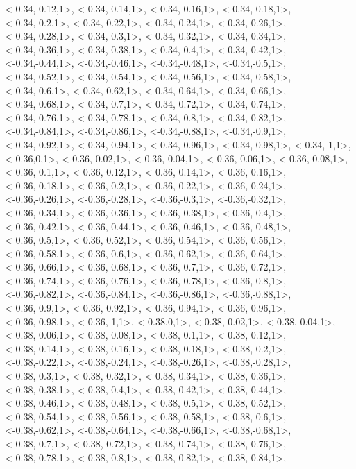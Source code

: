 \documentclass[a4paper,10pt]{article}
\begin{document}
\begin{eulernotebook}
\begin{euleroutput}
  <-0.34,-0.12,1>,
  <-0.34,-0.14,1>,
  <-0.34,-0.16,1>,
  <-0.34,-0.18,1>,
  <-0.34,-0.2,1>,
  <-0.34,-0.22,1>,
  <-0.34,-0.24,1>,
  <-0.34,-0.26,1>,
  <-0.34,-0.28,1>,
  <-0.34,-0.3,1>,
  <-0.34,-0.32,1>,
  <-0.34,-0.34,1>,
  <-0.34,-0.36,1>,
  <-0.34,-0.38,1>,
  <-0.34,-0.4,1>,
  <-0.34,-0.42,1>,
  <-0.34,-0.44,1>,
  <-0.34,-0.46,1>,
  <-0.34,-0.48,1>,
  <-0.34,-0.5,1>,
  <-0.34,-0.52,1>,
  <-0.34,-0.54,1>,
  <-0.34,-0.56,1>,
  <-0.34,-0.58,1>,
  <-0.34,-0.6,1>,
  <-0.34,-0.62,1>,
  <-0.34,-0.64,1>,
  <-0.34,-0.66,1>,
  <-0.34,-0.68,1>,
  <-0.34,-0.7,1>,
  <-0.34,-0.72,1>,
  <-0.34,-0.74,1>,
  <-0.34,-0.76,1>,
  <-0.34,-0.78,1>,
  <-0.34,-0.8,1>,
  <-0.34,-0.82,1>,
  <-0.34,-0.84,1>,
  <-0.34,-0.86,1>,
  <-0.34,-0.88,1>,
  <-0.34,-0.9,1>,
  <-0.34,-0.92,1>,
  <-0.34,-0.94,1>,
  <-0.34,-0.96,1>,
  <-0.34,-0.98,1>,
  <-0.34,-1,1>,
  <-0.36,0,1>,
  <-0.36,-0.02,1>,
  <-0.36,-0.04,1>,
  <-0.36,-0.06,1>,
  <-0.36,-0.08,1>,
  <-0.36,-0.1,1>,
  <-0.36,-0.12,1>,
  <-0.36,-0.14,1>,
  <-0.36,-0.16,1>,
  <-0.36,-0.18,1>,
  <-0.36,-0.2,1>,
  <-0.36,-0.22,1>,
  <-0.36,-0.24,1>,
  <-0.36,-0.26,1>,
  <-0.36,-0.28,1>,
  <-0.36,-0.3,1>,
  <-0.36,-0.32,1>,
  <-0.36,-0.34,1>,
  <-0.36,-0.36,1>,
  <-0.36,-0.38,1>,
  <-0.36,-0.4,1>,
  <-0.36,-0.42,1>,
  <-0.36,-0.44,1>,
  <-0.36,-0.46,1>,
  <-0.36,-0.48,1>,
  <-0.36,-0.5,1>,
  <-0.36,-0.52,1>,
  <-0.36,-0.54,1>,
  <-0.36,-0.56,1>,
  <-0.36,-0.58,1>,
  <-0.36,-0.6,1>,
  <-0.36,-0.62,1>,
  <-0.36,-0.64,1>,
  <-0.36,-0.66,1>,
  <-0.36,-0.68,1>,
  <-0.36,-0.7,1>,
  <-0.36,-0.72,1>,
  <-0.36,-0.74,1>,
  <-0.36,-0.76,1>,
  <-0.36,-0.78,1>,
  <-0.36,-0.8,1>,
  <-0.36,-0.82,1>,
  <-0.36,-0.84,1>,
  <-0.36,-0.86,1>,
  <-0.36,-0.88,1>,
  <-0.36,-0.9,1>,
  <-0.36,-0.92,1>,
  <-0.36,-0.94,1>,
  <-0.36,-0.96,1>,
  <-0.36,-0.98,1>,
  <-0.36,-1,1>,
  <-0.38,0,1>,
  <-0.38,-0.02,1>,
  <-0.38,-0.04,1>,
  <-0.38,-0.06,1>,
  <-0.38,-0.08,1>,
  <-0.38,-0.1,1>,
  <-0.38,-0.12,1>,
  <-0.38,-0.14,1>,
  <-0.38,-0.16,1>,
  <-0.38,-0.18,1>,
  <-0.38,-0.2,1>,
  <-0.38,-0.22,1>,
  <-0.38,-0.24,1>,
  <-0.38,-0.26,1>,
  <-0.38,-0.28,1>,
  <-0.38,-0.3,1>,
  <-0.38,-0.32,1>,
  <-0.38,-0.34,1>,
  <-0.38,-0.36,1>,
  <-0.38,-0.38,1>,
  <-0.38,-0.4,1>,
  <-0.38,-0.42,1>,
  <-0.38,-0.44,1>,
  <-0.38,-0.46,1>,
  <-0.38,-0.48,1>,
  <-0.38,-0.5,1>,
  <-0.38,-0.52,1>,
  <-0.38,-0.54,1>,
  <-0.38,-0.56,1>,
  <-0.38,-0.58,1>,
  <-0.38,-0.6,1>,
  <-0.38,-0.62,1>,
  <-0.38,-0.64,1>,
  <-0.38,-0.66,1>,
  <-0.38,-0.68,1>,
  <-0.38,-0.7,1>,
  <-0.38,-0.72,1>,
  <-0.38,-0.74,1>,
  <-0.38,-0.76,1>,
  <-0.38,-0.78,1>,
  <-0.38,-0.8,1>,
  <-0.38,-0.82,1>,
  <-0.38,-0.84,1>,

\end{euleroutput}
\end{eulernotebook}
\end{document}
